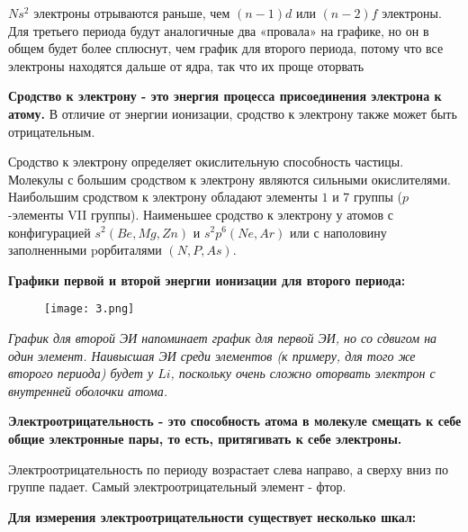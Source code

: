 $Ns^2$ электроны отрываются раньше, чем $(n-1)d$ или $(n-2)f$ электроны.
Для третьего периода будут аналогичные два «провала» на
графике, но он в общем будет более сплюснут, чем график для
второго периода, потому что все электроны находятся дальше от
ядра, так что их проще оторвать

\par\smallskip
	
\textbf{Сродство к электрону - это энергия процесса присоединения
электрона к атому.} В отличие от энергии ионизации, сродство к
электрону также может быть отрицательным.

\par\smallskip

Сродство к электрону определяет окислительную способность
частицы. Молекулы с большим сродством к электрону являются
сильными окислителями. Наибольшим сродством к электрону
обладают элементы $1$ и $7$ группы ($p$-элементы VII группы).
Наименьшее сродство к электрону у атомов с конфигурацией $s^2 (Be,
Mg, Zn)$ и $s^2p^6 (Ne, Ar)$ или с наполовину заполненными pорбиталями $(N, P, As)$.

\begin{center}
\textbf{Графики первой и второй энергии ионизации для второго периода:}
\end{center}

\begin{figure}[h]
	\centering
	{\texttt{[image: 3.png]}}
\end{figure}

\textit{График для второй ЭИ напоминает график для первой ЭИ, но со сдвигом на один элемент. Наивысшая ЭИ среди элементов (к примеру, для того же второго периода)
	будет у $Li$, поскольку очень сложно оторвать электрон с внутренней оболочки атома.}

\par\smallskip

\textbf{Электроотрицательность - это способность атома в молекуле
	смещать к себе общие электронные пары, то есть, притягивать к
	себе электроны.}

\par\smallskip

Электроотрицательность по периоду возрастает слева направо, а
сверху вниз по группе падает. Самый электроотрицательный
элемент - фтор.

\begin{center}
	\textbf{Для измерения электроотрицательности существует несколько
		шкал:}
\end{center}


